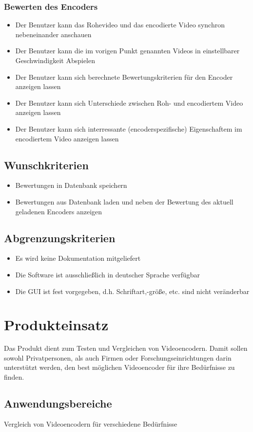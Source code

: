 \documentclass[parskip=full]{scrartcl}
\begin{document}
\subsubsection{Bewerten des Encoders}
\begin{itemize}
\item Der Benutzer kann das Rohevideo und das encodierte Video synchron nebeneinander anschauen
\item Der Benutzer kann die im vorigen Punkt genannten Videos in einstellbarer Geschwindigkeit
Abspielen
\item Der Benutzer kann sich berechnete Bewertungskriterien für den Encoder anzeigen lassen
\item Der Benutzer kann sich Unterschiede zwischen Roh- und encodiertem Video anzeigen lassen
\item Der Benutzer kann sich interressante (encoderspezifische) Eigenschaftem im encodiertem
Video anzeigen lassen
\end{itemize}
\subsection{Wunschkriterien}
\begin{itemize}
\item Bewertungen in Datenbank speichern
\item Bewertungen aus Datenbank laden und neben der Bewertung des aktuell geladenen Encoders anzeigen
\end{itemize}
\subsection{Abgrenzungskriterien}
\begin{itemize}
\item Es wird keine Dokumentation mitgeliefert
\item Die Software ist ausschließlich in deutscher Sprache verfügbar
\item Die GUI ist fest vorgegeben, d.h. Schriftart,-größe, etc. sind nicht veränderbar
\end{itemize}
\section{Produkteinsatz}
Das Produkt dient zum Testen und Vergleichen von Videoencodern. 
Damit sollen sowohl Privatpersonen, als auch Firmen oder Forschungseinrichtungen darin unterstützt werden, den best möglichen Videoencoder für ihre Bedürfnisse zu finden.
\subsection{Anwendungsbereiche}
Vergleich von Videoencodern für verschiedene Bedürfnisse
\end{document}
